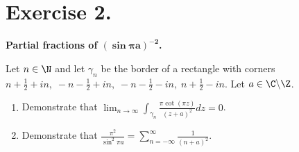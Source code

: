 \section*{Exercise 2.}

\textbf{Partial fractions of $\boldsymbol{(\sin \pi a)^{-2}}$.}

Let $n\in \N$ and let $\gamma_n$ be the border of a rectangle with corners $n+\frac{1}{2}+in,\; -n-\frac{1}{2}+in,\; -n-\frac{1}{2}-in,\; n + \frac{1}{2}-in$. Let $a \in \C \backslash \Z$.
\begin{enumerate}[label=(\alph*)]
    \item Demonstrate that $\displaystyle \lim_{n\to \infty} \int_{\gamma_n} \frac{\pi \cot(\pi z)}{(z+a)^2} dz = 0$.
    \item Demonstrate that $\displaystyle \frac{\pi^2}{\sin^2 \pi a} = \sum_{n = -\infty}^{\infty}\frac{1}{(n+a)^2}$.
\end{enumerate}